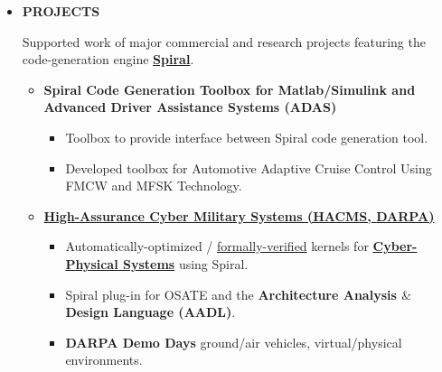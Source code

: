\documentclass{article}
\begin{document}
    \begin{itemize}

      \item \textbf{PROJECTS}

      Supported work of major commercial and research projects featuring the code-generation engine \textbf{\href{http://spiral.net/}{Spiral}}.

      \begin{itemize}

        \item \textbf{Spiral Code Generation Toolbox for Matlab/Simulink and Advanced Driver Assistance Systems (ADAS)}

        \begin{itemize}
          \item Toolbox to provide interface between Spiral code generation tool.
          \item Developed toolbox for Automotive Adaptive Cruise Control Using FMCW and MFSK Technology.
        \end{itemize}

        \item \textbf{\href{http://www.darpa.mil/Our_Work/I2O/Programs/High-Assurance_Cyber_Military_Systems_(HACMS).aspx}{High-Assurance Cyber Military Systems (HACMS, \href{http://www.darpa.mil/default.aspx}{DARPA})}}

        \begin{itemize}

          \item Automatically-optimized / \href{https://en.wikipedia.org/wiki/Formal_methods}{formally-verified} kernels for \textbf{\href{https://en.wikipedia.org/wiki/Cyber-physical_system}{Cyber-Physical Systems}} using Spiral. 

          \item Spiral plug-in for OSATE and the \textbf{Architecture Analysis $\&$ Design Language (AADL)}.

          \item \textbf{DARPA Demo Days} ground/air vehicles, virtual/physical environments.  



\end{itemize}
\end{itemize}
\end{itemize}
\end{document}
